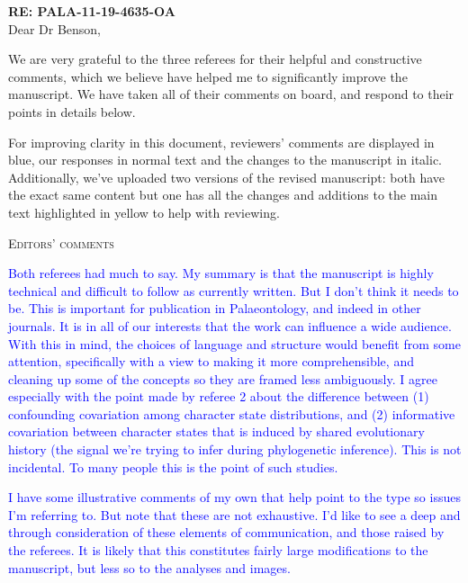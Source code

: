 \documentclass[12pt,letterpaper]{article}
\renewcommand{\section}[1]{%
\bigskip
\begin{center}
\begin{Large}
\normalfont\scshape #1
\medskip
\end{Large}
\end{center}}
\begin{document}
\textbf{RE: PALA-11-19-4635-OA}\\
\bigskip
Dear Dr Benson,\\
\bigskip

We are very grateful to the three referees for their helpful and constructive comments, which we believe have helped me to significantly improve the manuscript.
We have taken all of their comments on board, and respond to their points in details below.

For improving clarity in this document, reviewers' comments are displayed in blue, our responses in normal text and the changes to the manuscript in italic.
Additionally, we've uploaded two versions of the revised manuscript: both have the exact same content but one has all the changes and additions to the main text highlighted in yellow to help with reviewing.








\section{Editors' comments}

\textcolor{blue}{Both referees had much to say. My summary is that the manuscript is highly technical and difficult to follow as currently written. But I don't think it needs to be. This is important for publication in Palaeontology, and indeed in other journals. It is in all of our interests that the work can influence a wide audience. With this in mind, the choices of language and structure would benefit from some attention, specifically with a view to making it more comprehensible, and cleaning up some of the concepts so they are framed less ambiguously. I agree especially with the point made by referee 2 about the difference between (1) confounding covariation among character state distributions, and (2) informative covariation between character states that is induced by shared evolutionary history (the signal we're trying to infer during phylogenetic inference). This is not incidental. To many people this is the point of such studies.}

\textcolor{blue}{I have some illustrative comments of my own that help point to the type so issues I'm referring to. But note that these are not exhaustive. I'd like to see a deep and through consideration of these elements of communication, and those raised by the referees. It is likely that this constitutes fairly large modifications to the manuscript, but less so to the analyses and images.}
\end{document}
